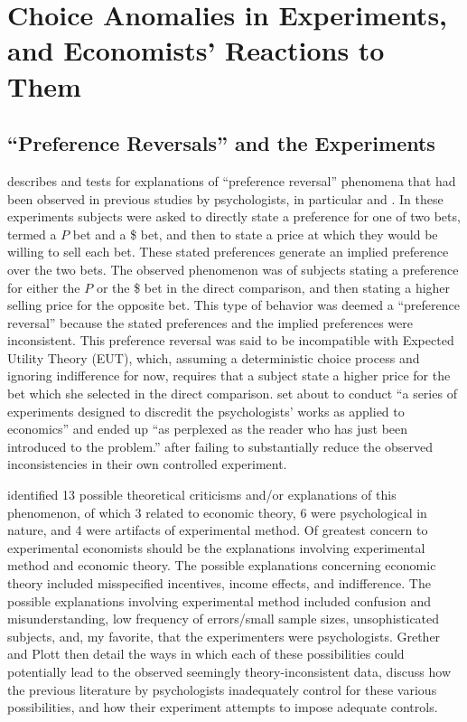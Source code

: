 \documentclass[../main.tex]{subfiles}
\begin{document}
\doublespacing
\setcounter{chapter}{0}
\singlespacing
\chapter{Choice Anomalies in Experiments, and Economists' Reactions to Them}
\doublespacing

\lltoc

\singlespacing
\section{\enquote{Preference Reversals} and the \texorpdfstring{\textcite{Grether1979}}{Grether \& Plott (1979)}  Experiments}
\doublespacing

\textcite{Grether1979} describes and tests for explanations of \enquote{preference reversal} phenomena that had been observed in previous studies by psychologists, in particular \textcite{Lichtenstein1971, Lichtenstein1973} and \textcite{Lindman1971}.
In these experiments subjects were asked to directly state a preference for one of two bets, termed a $P$ bet and a {\$} bet,  and then to state a price at which they would be willing to sell each bet.
These stated preferences generate an implied preference over the two bets.
The observed phenomenon was of subjects stating a preference for either the $P$ or the {\$} bet in the direct comparison, and then stating a higher selling price for the opposite bet.
This type of behavior was deemed a \enquote{preference reversal} because the stated preferences and the implied preferences were inconsistent.
This preference reversal was said to be incompatible with Expected Utility Theory (EUT), which, assuming a deterministic choice process and ignoring indifference for now, requires that a subject state a higher price for the bet which she selected in the direct comparison.
\textcite[623]{Grether1979} set about to conduct \enquote{a series of experiments designed to discredit the psychologists' works as applied to economics} and ended up \enquote{as perplexed as the reader who has just been introduced to the problem.} \parencite*[624]{Grether1979} after failing to substantially reduce the observed inconsistencies in their own controlled experiment.

\textcite{Grether1979} identified 13 possible theoretical criticisms and/or explanations of this phenomenon, of which 3 related to economic theory, 6 were psychological in nature, and 4 were artifacts of experimental method.
Of greatest concern to experimental economists should be the explanations involving experimental method and economic theory.
The possible explanations concerning economic theory included misspecified incentives, income effects, and indifference.
The possible explanations involving experimental method included confusion and misunderstanding, low frequency of errors/small sample sizes, unsophisticated subjects, and, my favorite, that the experimenters were psychologists.
Grether and Plott then detail the ways in which each of these possibilities could potentially lead to the observed seemingly theory-inconsistent data, discuss how the previous literature by psychologists inadequately control for these various possibilities, and how their experiment attempts to impose adequate controls.
\end{document}
